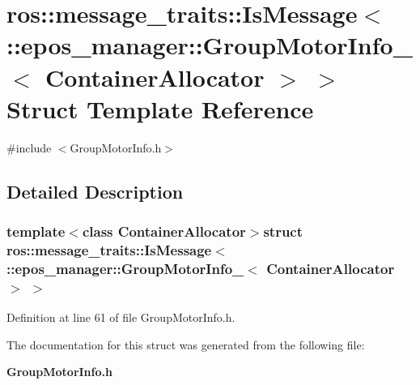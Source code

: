 \section{ros\-:\-:message\-\_\-traits\-:\-:\-Is\-Message$<$ \-:\-:epos\-\_\-manager\-:\-:\-Group\-Motor\-Info\-\_\-$<$ \-Container\-Allocator $>$ $>$ \-Struct \-Template \-Reference}
\label{structros_1_1message__traits_1_1IsMessage_3_01_1_1epos__manager_1_1GroupMotorInfo___3_01ContainerAllocator_01_4_01_4}


{\ttfamily \#include $<$\-Group\-Motor\-Info.\-h$>$}



\subsection{\-Detailed \-Description}
\subsubsection*{template$<$class Container\-Allocator$>$struct ros\-::message\-\_\-traits\-::\-Is\-Message$<$ \-::epos\-\_\-manager\-::\-Group\-Motor\-Info\-\_\-$<$ Container\-Allocator $>$ $>$}



\-Definition at line 61 of file \-Group\-Motor\-Info.\-h.



\-The documentation for this struct was generated from the following file\-:\begin{DoxyCompactItemize}
\item 
{\bf \-Group\-Motor\-Info.\-h}\end{DoxyCompactItemize}
